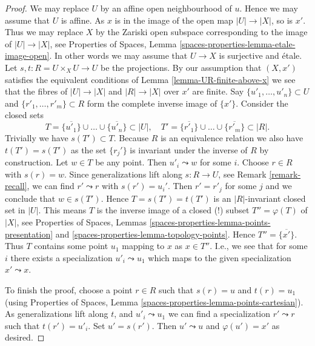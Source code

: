 \begin{proof}
We may replace $U$ by an affine open neighbourhood of $u$.
Hence we may assume that $U$ is affine. As $x$ is in the
image of the open map $|U| \to |X|$, so is $x'$. Thus we may
replace $X$ by the Zariski open subspace corresponding to
the image of $|U| \to |X|$, see
Properties of Spaces,
Lemma \ref{spaces-properties-lemma-etale-image-open}.
In other words we may assume that
$U \to X$ is surjective and \'etale.
Let $s, t : R = U \times_X U \to U$ be the projections.
By our assumption that $(X, x')$ satisfies the equivalent conditions of
Lemma \ref{lemma-UR-finite-above-x}
we see that the fibres of $|U| \to |X|$ and $|R| \to |X|$
over $x'$ are finite. Say $\{u'_1, \ldots, u'_n\} \subset U$ and
$\{r'_1, \ldots, r'_m\} \subset R$ form the complete inverse image
of $\{x'\}$.
Consider the closed sets
$$
T = \overline{\{u'_1\}} \cup \ldots \cup \overline{\{u'_n\}} \subset |U|,
\quad
T' = \overline{\{r'_1\}} \cup \ldots \cup \overline{\{r'_m\}} \subset |R|.
$$
Trivially we have $s(T') \subset T$. Because $R$ is an equivalence
relation we also have $t(T') = s(T')$ as the set $\{r_j'\}$
is invariant under the inverse of $R$ by construction. Let $w \in T$
be any point. Then $u'_i \leadsto w$ for some $i$. Choose $r \in R$
with $s(r) = w$. Since generalizations lift along $s : R \to U$, see
Remark \ref{remark-recall}, we can find $r' \leadsto r$ with
$s(r') = u_i'$. Then $r' = r'_j$ for some $j$ and we conclude that
$w \in s(T')$. Hence $T = s(T') = t(T')$ is an $|R|$-invariant closed
set in $|U|$. This means $T$ is the inverse image of a closed (!)
subset $T'' = \varphi(T)$ of $|X|$, see
Properties of Spaces,
Lemmas \ref{spaces-properties-lemma-points-presentation} and
\ref{spaces-properties-lemma-topology-points}.
Hence $T'' = \overline{\{x'\}}$.
Thus $T$ contains some point $u_1$ mapping to $x$ as $x \in T''$.
I.e., we see that for some $i$ there exists a specialization
$u'_i \leadsto u_1$ which maps to the given specialization
$x' \leadsto x$.

\medskip\noindent
To finish the proof, choose a point $r \in R$ such that
$s(r) = u$ and $t(r) = u_1$ (using
Properties of Spaces,
Lemma \ref{spaces-properties-lemma-points-cartesian}).
As generalizations lift along $t$, and $u'_i \leadsto u_1$
we can find a specialization $r' \leadsto r$ such that $t(r') = u'_i$.
Set $u' = s(r')$. Then $u' \leadsto u$ and $\varphi(u') = x'$ as
desired.
\end{proof}








